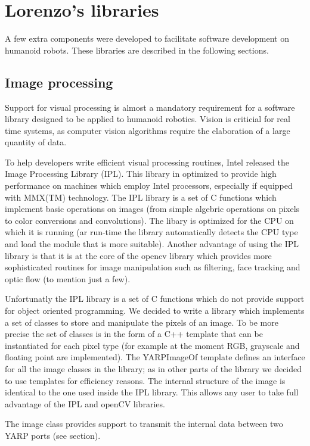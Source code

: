 \section{Lorenzo's libraries}
A few extra components were developed to facilitate software development on humanoid robots. These libraries are described in the following sections.

\subsection{Image processing}
Support for visual processing is almost a mandatory requirement for a software library designed to be applied to humanoid robotics. Vision is criticial for real time systems, as computer vision algorithms require the elaboration of a large quantity of data.

To help developers write efficient visual processing routines, Intel released the Image Processing Library (IPL). This library in optimized to provide high performance on machines which employ Intel processors, especially if equipped with MMX(TM) technology. The IPL library is a set of C functions which implement basic operations on images (from simple algebric operations on pixels to color conversions and convolutions). The libary is optimized for the CPU on which it is running (ar run-time the library automatically detects the CPU type and load the module that is more suitable). Another advantage of using the IPL library is that it is at the core of the opencv library which provides more sophisticated routines for image manipulation such as filtering, face tracking and optic flow (to mention just a few).

Unfortunatly the IPL library is a set of C functions which do not provide support for object oriented programming. We decided to write a library which implements a set of classes to store and manipulate the pixels of an image. To be more precise the set of classes is in the form of a C++ template that can be instantiated for each pixel type (for example at the moment RGB, grayscale and floating point are implemented). The YARPImageOf template defines an interface for all the image classes in the library; as in other parts of the library we decided to use templates for efficiency reasons. The internal structure of the image is identical to the one used inside the IPL library. This allows any user to take full advantage of the IPL and openCV libraries.

The image class provides support to transmit the internal data between two YARP ports (see section).

